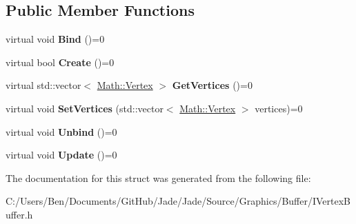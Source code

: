 \subsection*{Public Member Functions}
\begin{DoxyCompactItemize}
\item 
\hypertarget{struct_jade_1_1_graphics_1_1_i_vertex_buffer_a9b715c32b88c9825b143cae785cd36df}{}virtual void {\bfseries Bind} ()=0\label{struct_jade_1_1_graphics_1_1_i_vertex_buffer_a9b715c32b88c9825b143cae785cd36df}

\item 
\hypertarget{struct_jade_1_1_graphics_1_1_i_vertex_buffer_a11bdde3c98e13758b261de9c7b9ccc17}{}virtual bool {\bfseries Create} ()=0\label{struct_jade_1_1_graphics_1_1_i_vertex_buffer_a11bdde3c98e13758b261de9c7b9ccc17}

\item 
\hypertarget{struct_jade_1_1_graphics_1_1_i_vertex_buffer_a2c3432b5a173d533a9d4d22ccdde8c25}{}virtual std\+::vector$<$ \hyperlink{struct_jade_1_1_math_1_1_vertex}{Math\+::\+Vertex} $>$ {\bfseries Get\+Vertices} ()=0\label{struct_jade_1_1_graphics_1_1_i_vertex_buffer_a2c3432b5a173d533a9d4d22ccdde8c25}

\item 
\hypertarget{struct_jade_1_1_graphics_1_1_i_vertex_buffer_a12d631e9c2f6b0270fc3d727933a538e}{}virtual void {\bfseries Set\+Vertices} (std\+::vector$<$ \hyperlink{struct_jade_1_1_math_1_1_vertex}{Math\+::\+Vertex} $>$ vertices)=0\label{struct_jade_1_1_graphics_1_1_i_vertex_buffer_a12d631e9c2f6b0270fc3d727933a538e}

\item 
\hypertarget{struct_jade_1_1_graphics_1_1_i_vertex_buffer_a7352d3a1aed4d79a200cec3f1b7a77d7}{}virtual void {\bfseries Unbind} ()=0\label{struct_jade_1_1_graphics_1_1_i_vertex_buffer_a7352d3a1aed4d79a200cec3f1b7a77d7}

\item 
\hypertarget{struct_jade_1_1_graphics_1_1_i_vertex_buffer_a09a901410d43406272907cce3f8f67d5}{}virtual void {\bfseries Update} ()=0\label{struct_jade_1_1_graphics_1_1_i_vertex_buffer_a09a901410d43406272907cce3f8f67d5}

\end{DoxyCompactItemize}


The documentation for this struct was generated from the following file\+:\begin{DoxyCompactItemize}
\item 
C\+:/\+Users/\+Ben/\+Documents/\+Git\+Hub/\+Jade/\+Jade/\+Source/\+Graphics/\+Buffer/I\+Vertex\+Buffer.\+h\end{DoxyCompactItemize}
